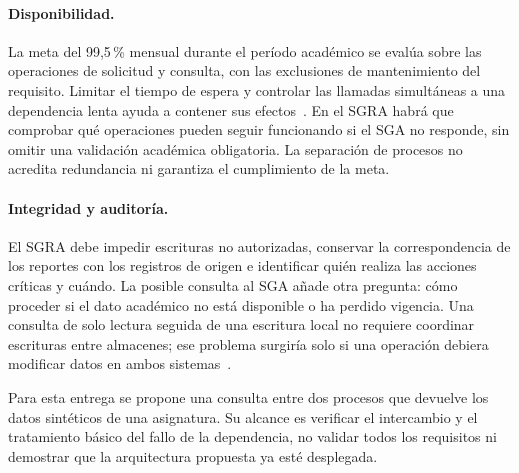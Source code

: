 \paragraph{Disponibilidad.}
La meta del 99,5\,\% mensual durante el período académico se evalúa sobre las operaciones de solicitud y consulta, con las exclusiones de mantenimiento del requisito. Limitar el tiempo de espera y controlar las llamadas simultáneas a una dependencia lenta ayuda a contener sus efectos~\cite{botros2024-unfragile,soylemez2022-challenges}. En el SGRA habrá que comprobar qué operaciones pueden seguir funcionando si el SGA no responde, sin omitir una validación académica obligatoria. La separación de procesos no acredita redundancia ni garantiza el cumplimiento de la meta.

\paragraph{Integridad y auditoría.}
El SGRA debe impedir escrituras no autorizadas, conservar la correspondencia de los reportes con los registros de origen e identificar quién realiza las acciones críticas y cuándo. La posible consulta al SGA añade otra pregunta: cómo proceder si el dato académico no está disponible o ha perdido vigencia. Una consulta de solo lectura seguida de una escritura local no requiere coordinar escrituras entre almacenes; ese problema surgiría solo si una operación debiera modificar datos en ambos sistemas~\cite{soylemez2022-challenges,daraghmi2022-saga,almeida2022-authentication}.

Para esta entrega se propone una consulta entre dos procesos que devuelve los datos sintéticos de una asignatura. Su alcance es verificar el intercambio y el tratamiento básico del fallo de la dependencia, no validar todos los requisitos ni demostrar que la arquitectura propuesta ya esté desplegada.
